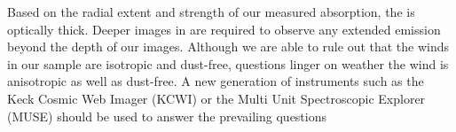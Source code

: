 \documentclass[twocolumn]{aastex61}
\begin{document}
Based on the radial extent and strength of our measured  absorption, the  is optically thick. Deeper images in  are required to observe any extended emission beyond the depth of our images. Although we are able to rule out that the winds in our sample are isotropic and dust-free, questions linger on weather the wind is anisotropic as well as dust-free. A new generation of instruments such as the Keck Cosmic Web Imager (KCWI) or the Multi Unit Spectroscopic Explorer (MUSE) should be used to answer the prevailing questions



\end{document}
